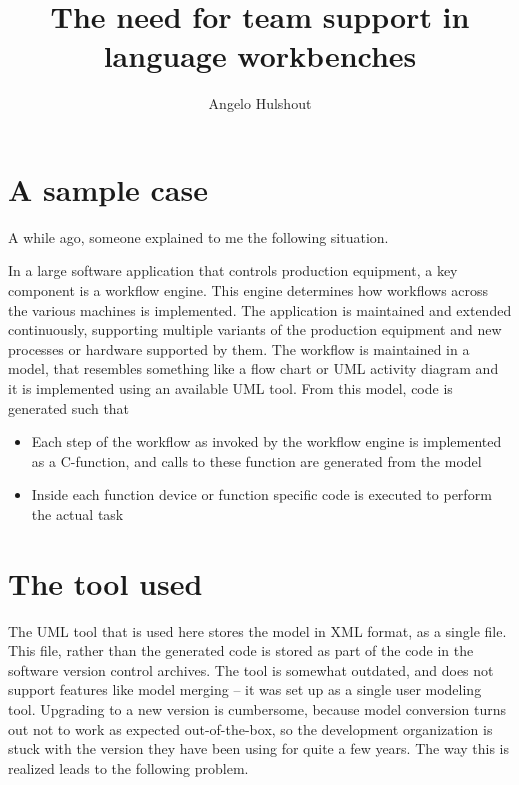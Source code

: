 \documentclass[11pt]{article} %
\title{The need for team support in language workbenches}
\author{Angelo Hulshout}
\begin{document}
\maketitle

\section{A sample case}
A while ago, someone explained to me the following situation.

In a large software application that controls production equipment, a key component is a workflow engine. This engine determines how workflows across the various machines is implemented.
The application is maintained and extended continuously, supporting multiple variants of the production equipment and new processes or hardware supported by them.
The workflow is maintained in a model, that resembles something like a flow chart or UML activity diagram and it is implemented using an available UML tool. From this model, code is generated such that
\begin{itemize}
\item	Each step of the workflow as invoked by the workflow engine is implemented as a C-function, and calls to these function are generated from the model
\item	Inside each function device or function specific code is executed to perform the actual task
\end{itemize}

\section{The tool used}
The UML tool that is used here stores the model in XML format, as a single file. This file, rather than the generated code is stored as part of the code in the software version control archives. The tool is somewhat outdated, and does not support features like model merging – it was set up as a single user modeling tool. Upgrading to a new version is cumbersome, because model conversion turns out not to work as expected out-of-the-box, so the development organization is stuck with the version they have been using for quite a few years.
The way this is realized leads to the following problem.
\end{document}
